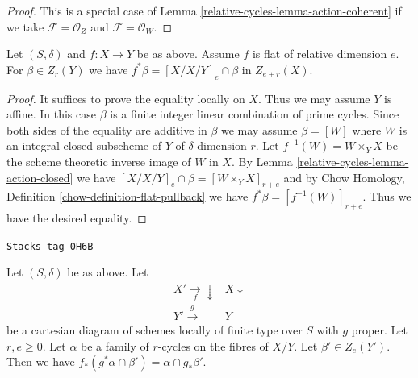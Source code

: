 \begin{proof}
This is a special case of Lemma \ref{relative-cycles-lemma-action-coherent}
if we take $\mathcal{F} = \mathcal{O}_Z$ and $\mathcal{F} = \mathcal{O}_W$.
\end{proof}

\begin{lemma}
\label{relative-cycles-lemma-flat-pullback-as-action}

Let $(S, \delta)$ and $f : X \to Y$ be as above. Assume
$f$ is flat of relative dimension $e$. For $\beta \in Z_r(Y)$
we have $f^*\beta = [X/X/Y]_e \cap \beta$ in $Z_{e + r}(X)$.
\end{lemma}

\begin{proof}
It suffices to prove the equality locally on $X$. Thus we may assume
$Y$ is affine. In this case $\beta$ is a finite integer linear combination
of prime cycles. Since both sides of the equality are additive in $\beta$
we may assume $\beta = [W]$ where $W$ is an integral closed subscheme of
$Y$ of $\delta$-dimension $r$. Let $f^{-1}(W) = W \times_Y X$ be the
scheme theoretic inverse image of $W$ in $X$. By
Lemma \ref{relative-cycles-lemma-action-closed} we have
$[X/X/Y]_e \cap \beta = [W \times_Y X]_{r + e}$ and by
Chow Homology, Definition \ref{chow-definition-flat-pullback}
we have $f^*\beta = [f^{-1}(W)]_{r + e}$. Thus we have the desired
equality.
\end{proof}

\begin{lemma}
\label{relative-cycles-lemma-action-push-pull}
\href{https://stacks.math.columbia.edu/tag/0H6B}{\texttt{Stacks tag 0H6B}}

Let $(S, \delta)$ be as above. Let
$$
\begin{array}{cc}X' \underset{f}{\longrightarrow}\downarrow & X \downarrow \\ Y' \overset{g}{\longrightarrow} & Y\end{array}
$$
be a cartesian diagram of schemes locally of finite type over $S$
with $g$ proper. Let $r, e \geq 0$. Let $\alpha$ be a family of
$r$-cycles on the fibres of $X/Y$. Let $\beta' \in Z_e(Y')$.
Then we have $f_*(g^*\alpha \cap \beta') = \alpha \cap g_*\beta'$.
\end{lemma}

